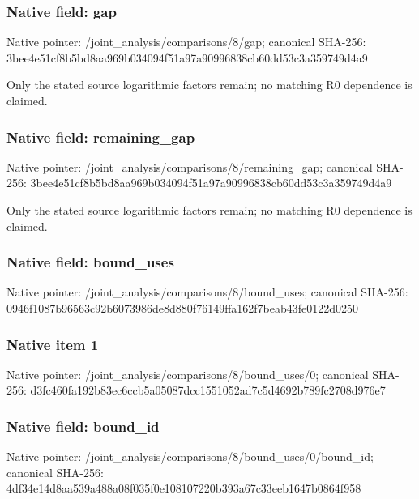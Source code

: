 \documentclass[10pt,a4paper]{article}
\begin{document}
\subsubsection{Native field: gap}


Native pointer: /joint\_analysis/comparisons/8/gap; canonical SHA-256: 3bee4e51cf8b5bd8aa969b03\allowbreak{}4094f51a97a90996838cb60d\allowbreak{}d53c3a359749d4a9


Only the stated source logarithmic factors remain; no matching R0 dependence is claimed.


\subsubsection{Native field: remaining\_gap}


Native pointer: /joint\_analysis/comparis\allowbreak{}ons/8/remaining\_gap; canonical SHA-256: 3bee4e51cf8b5bd8aa969b03\allowbreak{}4094f51a97a90996838cb60d\allowbreak{}d53c3a359749d4a9


Only the stated source logarithmic factors remain; no matching R0 dependence is claimed.


\subsubsection{Native field: bound\_uses}


Native pointer: /joint\_analysis/comparis\allowbreak{}ons/8/bound\_uses; canonical SHA-256: 0946f1087b96563c92b60739\allowbreak{}86de8d880f76149ffa162f7b\allowbreak{}eab43fe0122d0250



\subsubsection{Native item 1}


Native pointer: /joint\_analysis/comparis\allowbreak{}ons/8/bound\_uses/0; canonical SHA-256: d3fc460fa192b83ec6ccb5a0\allowbreak{}5087dcc1551052ad7c5d4692\allowbreak{}b789fc2708d976e7



\subsubsection{Native field: bound\_id}


Native pointer: /joint\_analysis/comparis\allowbreak{}ons/8/bound\_uses/0/bound\allowbreak{}\_id; canonical SHA-256: 4df34e14d8aa539a488a08f0\allowbreak{}35f0e108107220b393a67c33\allowbreak{}eeb1647b0864f958
\end{document}
